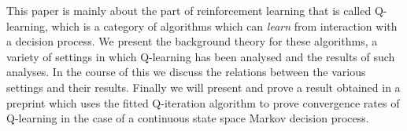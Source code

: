 
This paper is mainly about the part of reinforcement learning that is called
Q-learning, which is a category of algorithms which can \emph{learn} from
interaction with a decision process.
We present the background theory for these algorithms,
a variety of settings in which Q-learning has been analysed
and the results of such analyses.
In the course of this we discuss the relations between the various settings
and their results.
Finally we will present and prove a result obtained in a preprint
which uses the fitted Q-iteration algorithm to prove
convergence rates of Q-learning in the case of a
continuous state space Markov decision process.

